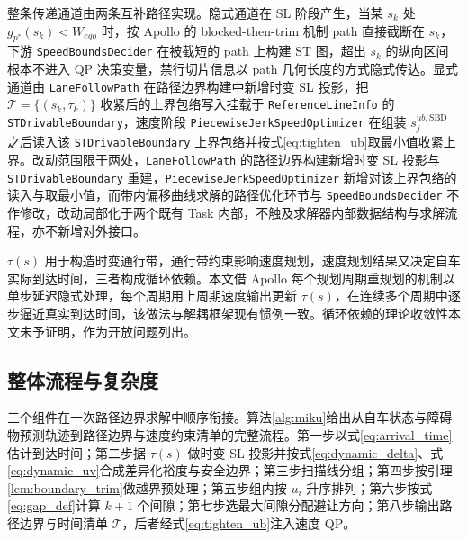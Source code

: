 \documentclass[a4paper,11pt]{ctexart}
\theoremstyle{definition}
\begin{document}
整条传递通道由两条互补路径实现。隐式通道在 SL 阶段产生，当某 $s_k$ 处 $g_{p^{*}}(s_k)<W_{ego}$ 时，按 Apollo 的 blocked-then-trim 机制 path 直接截断在 $s_k$，下游 \texttt{SpeedBoundsDecider} 在被截短的 path 上构建 ST 图，超出 $s_k$ 的纵向区间根本不进入 QP 决策变量，禁行切片信息以 path 几何长度的方式隐式传达。显式通道由 \texttt{LaneFollowPath} 在路径边界构建中新增时变 SL 投影，把 $\mathcal{T}=\{(s_k, \tau_k)\}$ 收紧后的上界包络写入挂载于 \texttt{ReferenceLineInfo} 的 \texttt{STDrivableBoundary}，速度阶段 \texttt{PiecewiseJerkSpeedOptimizer} 在组装 $s_j^{ub,\mathrm{SBD}}$ 之后读入该 \texttt{STDrivableBoundary} 上界包络并按式\eqref{eq:tighten_ub}取最小值收紧上界。改动范围限于两处，\texttt{LaneFollowPath} 的路径边界构建新增时变 SL 投影与 \texttt{STDrivableBoundary} 重建，\texttt{PiecewiseJerkSpeedOptimizer} 新增对该上界包络的读入与取最小值，而带内偏移曲线求解的路径优化环节与 \texttt{SpeedBoundsDecider} 不作修改，改动局部化于两个既有 Task 内部，不触及求解器内部数据结构与求解流程，亦不新增对外接口。

$\tau(s)$ 用于构造时变通行带，通行带约束影响速度规划，速度规划结果又决定自车实际到达时间，三者构成循环依赖。本文借 Apollo 每个规划周期重规划的机制以单步延迟隐式处理，每个周期用上周期速度输出更新 $\tau(s)$，在连续多个周期中逐步逼近真实到达时间，该做法与解耦框架现有惯例一致。循环依赖的理论收敛性本文未予证明，作为开放问题列出。

\subsection{整体流程与复杂度}
\label{sec:method_algorithm}

三个组件在一次路径边界求解中顺序衔接。算法\ref{alg:miku}给出从自车状态与障碍物预测轨迹到路径边界与速度约束清单的完整流程。第一步以式\eqref{eq:arrival_time}估计到达时间；第二步据 $\tau(s)$ 做时变 SL 投影并按式\eqref{eq:dynamic_delta}、式\eqref{eq:dynamic_uv}合成差异化裕度与安全边界；第三步扫描线分组；第四步按引理\ref{lem:boundary_trim}做越界预处理；第五步组内按 $u_i$ 升序排列；第六步按式\eqref{eq:gap_def}计算 $k+1$ 个间隙；第七步选最大间隙分配避让方向；第八步输出路径边界与时间清单 $\mathcal{T}$，后者经式\eqref{eq:tighten_ub}注入速度 QP。
\end{document}
